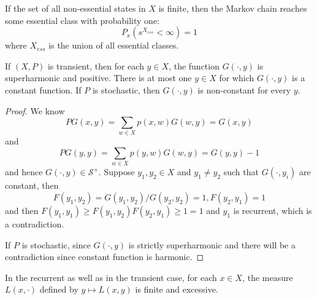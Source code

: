 \documentclass[lang=en,11pt,a4paper,citestyle =authoryear]{elegantpaper}
\newcommand{\Sar}{\mathcal{S}}
\begin{document}
\begin{lemma}
    If the set of all non-essential states in $X$ is finite, then the Markov chain reaches some essential class with probability one:
    \[P_x(s^{X_{ess}}<\infty) = 1\]
    where $X_{ess}$ is the union of all essential classes.
\end{lemma}

\begin{lemma}
    If $(X,P)$ is transient, then for each $y\in X$, the function $G(\cdot,y)$ is superharmonic and positive. There is at most one $y\in X$ for which $G(\cdot,y)$ is a constant function. If $P$ is stochastic, then $G(\cdot,y)$ is non-constant for every $y$.
\end{lemma}
\begin{proof}
    We know
    \[
    PG(x,y) = \sum\limits_{w\in X}p(x,w)G(w,y) = G(x,y)
    \]
    and
    \[
    PG(y,y) = \sum\limits_{w\in X}p(y,w)G(w,y) = G(y,y) - 1
    \]
    and hence $G(\cdot,y) \in \Sar^+$. Suppose $y_1,y_2\in X$ and $y_1\neq y_2$ such that $G(\cdot,y_i)$ are constant, then
    \[
    F(y_1,y_2) = G(y_1,y_2)/G(y_2,y_2) = 1, F(y_2,y_1) = 1
    \]
    and then $F(y_1,y_1) \geq F(y_1,y_2)F(y_2,y_1) \geq 1 = 1$ and $y_1$ is recurrent, which is a contradiction.\par
    If $P$ is stochastic, since $G(\cdot,y)$ is strictly superharmonic and there will be a contradiction since constant function is harmonic.
\end{proof}

\begin{lemma}
    In the recurrent as well as in the transient case, for each $x\in X$, the measure $L(x,\cdot)$ defined by $y\mapsto L(x,y)$ is finite and excessive.
\end{lemma}
\end{document}
